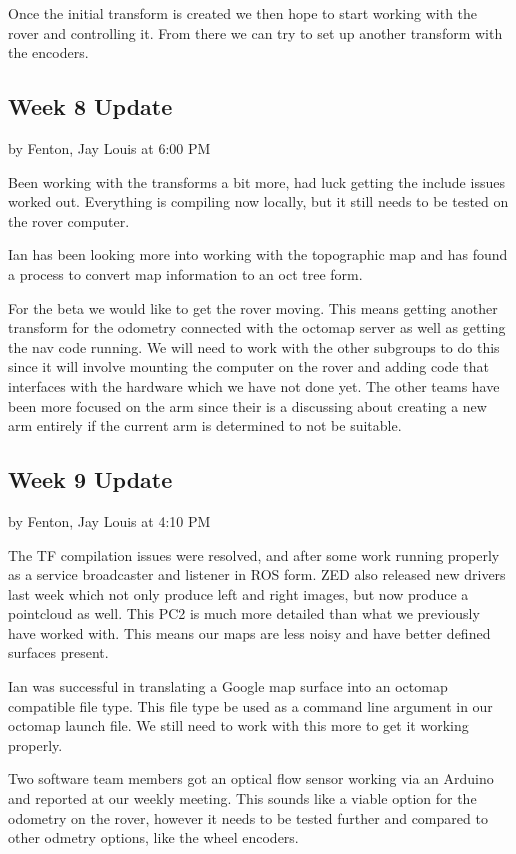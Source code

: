 \documentclass[10pt, oneside,onecolumn]{IEEEtran}
\begin{document}
Once the initial transform is created we then hope to start working with the rover and controlling it. From there we can try to set up another transform with the encoders.  

\subsection{Week 8 Update}
by Fenton, Jay Louis at 6:00 PM

Been working with the transforms a bit more, had luck getting the include issues worked out. Everything is compiling now locally, but it still needs to be tested on the rover computer. 

Ian has been looking more into working with the topographic map and has found a process to convert map information to an oct tree form. 

For the beta we would like to get the rover moving. This means getting another transform for the odometry connected with the octomap server as well as getting the nav code running. We will need to work with the other subgroups to do this since it will involve mounting the computer on the rover and adding code that interfaces with the hardware which we have not done yet. The other teams have been more focused on the arm since their is a discussing about creating a new arm entirely if the current arm is determined to not be suitable. 

\subsection{Week 9 Update}
by Fenton, Jay Louis at 4:10 PM

The TF compilation issues were resolved, and after some work running properly as a service broadcaster and listener in ROS form. ZED also released new drivers last week which not only produce left and right images, but now produce a pointcloud as well. This PC2 is much more detailed than what we previously have worked with. This means our maps are less noisy and have better defined surfaces present. 

Ian was successful in translating a Google map surface into an octomap compatible file type. This file type be used as a command line argument in our octomap launch file. We still need to work with this more to get it working properly. 

Two software team members got an optical flow sensor working via an Arduino and reported at our weekly meeting. This sounds like a viable option for the odometry on the rover, however it needs to be tested further and compared to other odmetry options, like the wheel encoders. 
\end{document}
